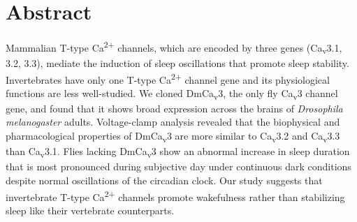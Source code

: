 \section*{Abstract}

Mammalian T-type Ca\textsuperscript{2+} channels, which are encoded by three genes (Ca\textsubscript{v}3.1, 3.2, 3.3), mediate the induction of sleep oscillations that promote sleep stability.
Invertebrates have only one T-type Ca\textsuperscript{2+} channel gene and its physiological functions are less well-studied.
We cloned DmCa\textsubscript{v}3, the only fly Ca\textsubscript{v}3 channel gene, and found that it shows broad expression across the brains of \emph{Drosophila melanogaster} adults.
Voltage-clamp analysis revealed that the biophysical and pharmacological properties of DmCa\textsubscript{v}3 are more similar to Ca\textsubscript{v}3.2 and Ca\textsubscript{v}3.3 than Ca\textsubscript{v}3.1.
Flies lacking DmCa\textsubscript{v}3 show an abnormal increase in sleep duration that is most pronounced during subjective day under continuous dark conditions despite normal oscillations of the circadian clock.
Our study suggests that invertebrate T-type Ca\textsuperscript{2+} channels promote wakefulness rather than stabilizing sleep like their vertebrate counterparts.